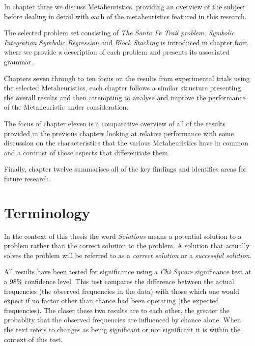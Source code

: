 In chapter three we discuss Metaheuristics, providing an overview of the subject before dealing in detail with each of the metaheuristics featured in this research.

The selected problem set consisting of  \emph{The Santa Fe Trail problem}, \emph{Symbolic Integration}  \emph{Symbolic Regression} and \emph{Block Stacking} is introduced in chapter four, where we provide a description of each problem and presents its associated grammar.

Chapters seven through to ten focus on the results from experimental trials using the selected Metaheuristics, each chapter follows a similar structure presenting the overall results and then attempting to analyse and improve the performance of the Metaheuristic under consideration.

The focus of chapter eleven is a comparative  overview of all of the results provided in the previous chapters looking at relative performance with some discussion on the characteristics that the various Metaheuristics have in common and a contrast of those aspects that differentiate them. 

Finally, chapter twelve summarises all of the key findings and identifies areas for future research.


\section{Terminology}
In the context of this thesis the word \emph{Solutions} means a potential solution to a problem rather than the correct solution to the problem. A solution that actually solves the problem will be referred to as a \emph{correct solution} or a \emph{successful solution}.

All results have been tested for significance using a \emph{Chi Square} significance test at a 98\% confidence level. This test compares the difference between the actual frequencies (the observed frequencies in the data) with those which one would expect if no factor other than chance had been operating (the expected frequencies). The closer these two results are to each other, the greater the probablity that the observed frequencies are influenced by chance alone. When the text refers to changes as being significant or not significant it is within the context of this test.  













































